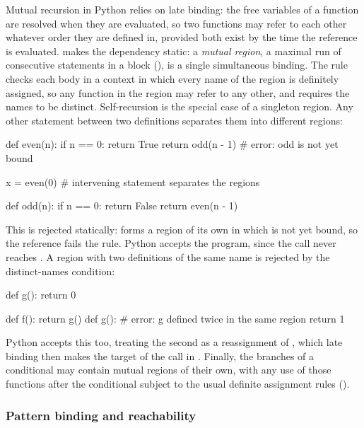 Mutual recursion in Python relies on late binding: the free variables of a function are resolved when
they are evaluated, so two functions may refer to each other whatever order they are defined in, provided
both exist by the time the reference is evaluated. \PurePy makes the
dependency static: a \emph{mutual region}, a maximal run of consecutive  statements in a
block (), is a single simultaneous binding. The  rule checks each body in a
context in which every name of the region is definitely assigned, so any function in the region may refer
to any other, and requires the names to be distinct. Self-recursion is the special case of a singleton
region. Any other statement between two definitions separates them into different regions:

\begin{python}
def even(n):
    if n == 0:
        return True
    return odd(n - 1)  # error: odd is not yet bound

x = even(0)  # intervening statement separates the regions

def odd(n):
    if n == 0:
        return False
    return even(n - 1)
\end{python}

\noindent This is rejected statically:  forms a region of its own in which 
is not yet bound, so the reference fails the  rule. Python accepts the program, since the
call  never reaches . A region with two definitions of the same name is
rejected by the distinct-names condition:

\begin{python}
def g():
    return 0

def f():
    return g()
def g():     # error: g defined twice in the same region
    return 1
\end{python}

\noindent Python accepts this too, treating the second  as a reassignment of ,
which late binding then makes the target of the call in . Finally, the branches of a conditional may contain mutual regions of their own, with any use of those
functions after the conditional subject to the usual definite assignment rules ().

\subsubsection{Pattern binding and reachability}
\label{sec:pattern-binding}

